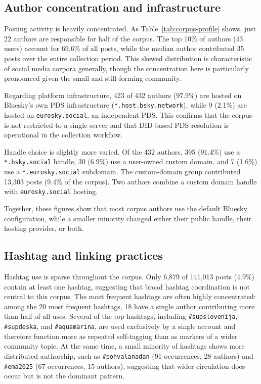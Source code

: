 \subsection{Author concentration and infrastructure}

Posting activity is heavily concentrated. As Table~\ref{tab:corpus-profile} shows, just 22 authors are responsible for half of the corpus. The top 10\% of authors (43 users) account for 69.6\% of all posts, while the median author contributed 35 posts over the entire collection period. This skewed distribution is characteristic of social media corpora generally, though the concentration here is particularly pronounced given the small and still-forming community.

Regarding platform infrastructure, 423 of 432 authors (97.9\%) are hosted on Bluesky's own PDS infrastructure (\texttt{*.host.bsky.network}), while 9 (2.1\%) are hosted on \texttt{eurosky.social}, an independent PDS. This confirms that the corpus is not restricted to a single server and that DID-based PDS resolution is operational in the collection workflow.

Handle choice is slightly more varied. Of the 432 authors, 395 (91.4\%) use a \texttt{*.bsky.social} handle, 30 (6.9\%) use a user-owned custom domain, and 7 (1.6\%) use a \texttt{*.eurosky.social} subdomain. The custom-domain group contributed 13,303 posts (9.4\% of the corpus). Two authors combine a custom domain handle with \texttt{eurosky.social} hosting.

Together, these figures show that most corpus authors use the default Bluesky configuration, while a smaller minority changed either their public handle, their hosting provider, or both.

\subsection{Hashtag and linking practices}

Hashtag use is sparse throughout the corpus. Only 6,879 of 141,013 posts (4.9\%) contain at least one hashtag, suggesting that broad hashtag coordination is not central to this corpus. The most frequent hashtags are often highly concentrated: among the 20 most frequent hashtags, 18 have a single author contributing more than half of all uses. Several of the top hashtags, including \texttt{\#supslovenija}, \texttt{\#supdeska}, and \texttt{\#aquamarina}, are used exclusively by a single account and therefore function more as repeated self-tagging than as markers of a wider community topic. At the same time, a small minority of hashtags shows more distributed authorship, such as \texttt{\#pohvalanadan} (91 occurrences, 28 authors) and \texttt{\#ema2025} (67 occurrences, 15 authors), suggesting that wider circulation does occur but is not the dominant pattern.

